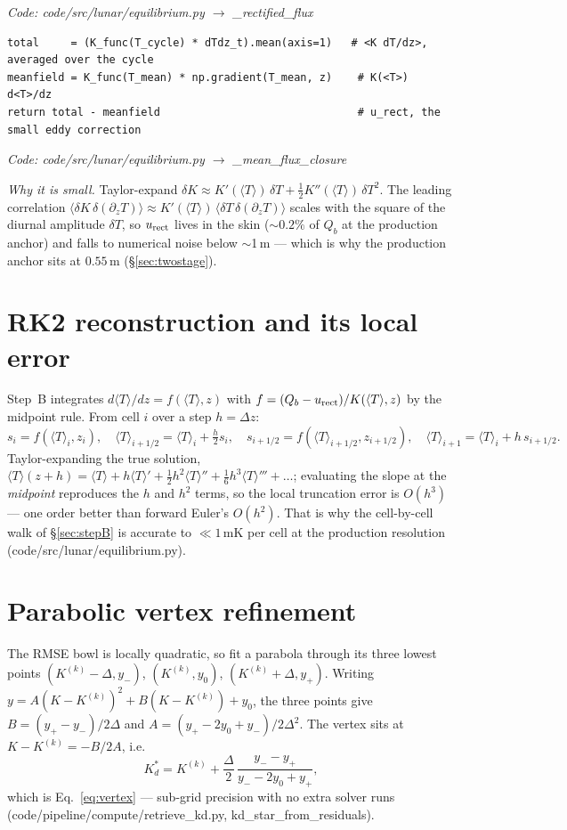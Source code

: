 \documentclass[11pt]{report}
\newcommand{\Tm}{\langle T\rangle}
\newcommand{\code}[1]{{\ttfamily\small #1}}
\begin{document}
{\small\color{dim}\textit{Code: \code{code/src/lunar/equilibrium.py} $\to$ \code{\_rectified\_flux}}}
\begin{lstlisting}[style=py]
total     = (K_func(T_cycle) * dTdz_t).mean(axis=1)   # <K dT/dz>, averaged over the cycle
meanfield = K_func(T_mean) * np.gradient(T_mean, z)    # K(<T>) d<T>/dz
return total - meanfield                               # u_rect, the small eddy correction
\end{lstlisting}

{\small\color{dim}\textit{Code: \code{code/src/lunar/equilibrium.py} $\to$ \code{\_mean\_flux\_closure}}}

\emph{Why it is small.} Taylor-expand $\delta K\approx K'(\Tm)\,\delta T
+\tfrac12 K''(\Tm)\,\delta T^2$. The leading correlation
$\langle\delta K\,\delta(\partial_z T)\rangle\approx
K'(\Tm)\,\langle\delta T\,\delta(\partial_z T)\rangle$ scales with the square of
the diurnal amplitude $\delta T$, so $u_{\rm rect}$ lives in the skin (${\sim}0.2\%$
of $Q_b$ at the production anchor) and falls to numerical noise below $\sim$1\,m ---
which is why the production anchor sits at $0.55$\,m (\S\ref{sec:twostage}).

\section{RK2 reconstruction and its local error}\label{app:rk2}
Step~B integrates $d\Tm/dz=f(\Tm,z)$ with $f=(Q_b-u_{\rm rect})/K(\Tm,z)$ by the
midpoint rule. From cell $i$ over a step $h=\Delta z$:
\[
s_i=f(\Tm_i,z_i),\quad
\Tm_{i+1/2}=\Tm_i+\tfrac{h}{2}s_i,\quad
s_{i+1/2}=f(\Tm_{i+1/2},z_{i+1/2}),\quad
\Tm_{i+1}=\Tm_i+h\,s_{i+1/2}.
\]
Taylor-expanding the true solution, $\Tm(z+h)=\Tm+h\Tm'+\tfrac12h^2\Tm''
+\tfrac16h^3\Tm'''+\dots$; evaluating the slope at the \emph{midpoint} reproduces
the $h$ and $h^2$ terms, so the local truncation error is $O(h^3)$ --- one order
better than forward Euler's $O(h^2)$. That is why the cell-by-cell walk of
\S\ref{sec:stepB} is accurate to $\ll1$\,mK per cell at the production resolution
(\code{code/src/lunar/equilibrium.py}).

\section{Parabolic vertex refinement}\label{app:vertex}
The RMSE bowl is locally quadratic, so fit a parabola through its three lowest
points $(K^{(k)}{-}\Delta,y_-)$, $(K^{(k)},y_0)$, $(K^{(k)}{+}\Delta,y_+)$. Writing
$y=A(K-K^{(k)})^2+B(K-K^{(k)})+y_0$, the three points give
$B=(y_+-y_-)/2\Delta$ and $A=(y_+-2y_0+y_-)/2\Delta^2$. The vertex sits at
$K-K^{(k)}=-B/2A$, i.e.
\[
\boxed{\;K_d^{*}=K^{(k)}+\frac{\Delta}{2}\,\frac{y_--y_+}{y_--2y_0+y_+},\;}
\]
which is Eq.~\eqref{eq:vertex} --- sub-grid precision with no extra solver runs
(\code{code/pipeline/compute/retrieve\_kd.py}, \code{kd\_star\_from\_residuals}).
\end{document}
